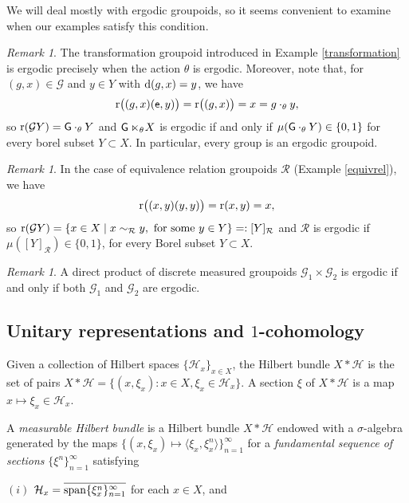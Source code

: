 \documentclass[a4paper,11pt]{article}
\numberwithin{equation}{section}
\theoremstyle{definition}
\theoremstyle{remark}
\newtheorem{rem}[thm]{Remark}
\numberwithin{equation}{section}
\newcommand{\rG}{\mathcal{G}}
\def\H{\mathcal H}
\def\e{{\sf e}}
\newcommand{\ol}[1]{\overline{#1}}
\newcommand{\spn}{{\rm span}}
\def\r{{\rm r}}
\def\d{{\rm d}}
\def\G{{\sf G}}
\def\<{\langle}
\def\>{\rangle}
\numberwithin{equation}{section}
\begin{document}
We will deal mostly with ergodic groupoids, so it seems convenient to examine when our examples satisfy this condition.

\begin{rem}
The transformation groupoid introduced in Example \ref{transformation} is ergodic precisely when the action $\theta$ is ergodic. Moreover, note that, for $(g,x)\in \rG$ and $y\in Y$ with $\d(g,x)=y$, we have 
$$
\r\big((g,x)(\e,y)\big)=\r\big((g,x)\big)=x=g\cdot_\theta y, 
$$
so $\r(\rG Y)=\G\cdot_\theta Y$ and $\G\ltimes_\theta\!X$ is ergodic if and only if $\mu(\G\cdot_\theta Y)\in\{0,1\}$ for every borel subset $Y\subset X$. In particular, every group is an ergodic groupoid.
\end{rem}

\begin{rem}
In the case of equivalence relation groupoids $\mathcal R$ (Example \ref{equivrel}), we have $$
\r\big((x,y)(y,y)\big)=\r(x,y)=x, 
$$
so $\r(\rG Y)=\{x\in X\mid x\sim_{\mathcal R} y,\textup{ for some }y\in Y\}=: [Y]_{\mathcal R}$ and $\mathcal R$ is ergodic if $\mu([Y]_{\mathcal R})\in\{0,1\} $, for every Borel subset $Y\subset X$.

\end{rem}

\begin{rem}
A direct product of discrete measured groupoids $\rG_1\times \rG_2$ is ergodic if and only if both $\rG_1$ and $\rG_2$ are ergodic. 
\end{rem}







\subsection{Unitary representations and $1$-cohomology}

Given a collection of Hilbert spaces $\{\H_x\}_{x \in X}$, the Hilbert bundle $X \ast \H$ is the set of pairs $X \ast \H = \{(x, \xi_x) : x \in X, \xi_x \in \H_x\}$. 
A section $\xi$ of $X \ast \H$ is a map $x \mapsto \xi_x \in \H_x$. 

A {\it measurable Hilbert bundle} is a Hilbert bundle $X \ast \H$ endowed with a $\sigma$-algebra generated by the maps $\{(x, \xi_x) \mapsto \<\xi_x, \xi^n_x\>\}_{n = 1}^\infty$ for a {\it fundamental sequence of sections} $\{\xi^n\}_{n = 1}^\infty$ satisfying 

$(i)$ $\H_x = \ol{\spn \{\xi^n_x\}_{n = 1}^\infty}$ for each $x \in X$, and 
\end{document}
